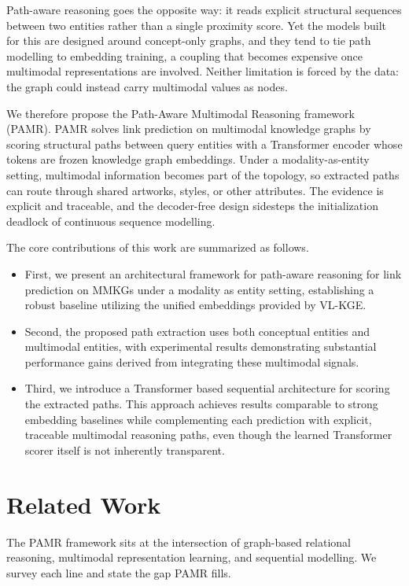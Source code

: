 \documentclass[runningheads]{llncs}
\begin{document}
Path-aware reasoning goes the opposite way: it reads explicit structural sequences between two entities rather than a single proximity score. Yet the models built for this are designed around concept-only graphs, and they tend to tie path modelling to embedding training, a coupling that becomes expensive once multimodal representations are involved. Neither limitation is forced by the data: the graph could instead carry multimodal values as nodes.

We therefore propose the Path-Aware Multimodal Reasoning framework (PAMR). PAMR solves link prediction on multimodal knowledge graphs by scoring structural paths between query entities with a Transformer encoder whose tokens are frozen knowledge graph embeddings. Under a modality-as-entity setting, multimodal information becomes part of the topology, so extracted paths can route through shared artworks, styles, or other attributes. The evidence is explicit and traceable, and the decoder-free design sidesteps the initialization deadlock of continuous sequence modelling.

The core contributions of this work are summarized as follows.

\begin{itemize}
  \item First, we present an architectural framework for path-aware reasoning for link prediction on MMKGs under a modality as entity setting, establishing a robust baseline utilizing the unified embeddings provided by VL-KGE.
  \item Second, the proposed path extraction uses both conceptual entities and multimodal entities, with experimental results demonstrating substantial performance gains derived from integrating these multimodal signals.
  \item Third, we introduce a Transformer based sequential architecture for scoring the extracted paths. This approach achieves results comparable to strong embedding baselines while complementing each prediction with explicit, traceable multimodal reasoning paths, even though the learned Transformer scorer itself is not inherently transparent.
\end{itemize}

\section{Related Work}
\label{sec:related-work}

The PAMR framework sits at the intersection of graph-based relational reasoning, multimodal representation learning, and sequential modelling. We survey each line and state the gap PAMR fills.
\end{document}
